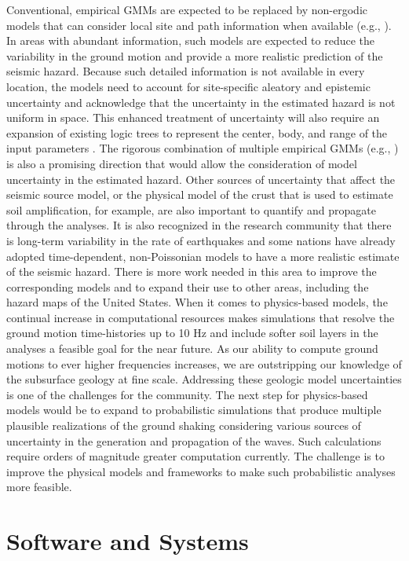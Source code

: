 Conventional, empirical GMMs are expected to be replaced by non-ergodic models that can consider local site and path information when available (e.g., \cite{abrahamson2019probabilistic}). In areas with abundant information, such models are expected to reduce the variability in the ground motion and provide a more realistic prediction of the seismic hazard. Because such detailed information is not available in every location, the models need to account for site-specific aleatory and epistemic uncertainty and acknowledge that the uncertainty in the estimated hazard is not uniform in space. This enhanced treatment of uncertainty will also require an expansion of existing logic trees to represent the center, body, and range of the input parameters \citep{gerstenberger2020seismic}.
The rigorous combination of multiple empirical GMMs (e.g., \cite{goulet2017ngaeast}) is also a promising direction that would allow the consideration of model uncertainty in the estimated hazard. Other sources of uncertainty that affect the seismic source model, or the physical model of the crust that is used to estimate soil amplification, for example, are also important to quantify and propagate through the analyses. 
It is also recognized in the research community that there is long-term variability in the rate of earthquakes and some nations have already adopted time-dependent, non-Poissonian models to have a more realistic estimate of the seismic hazard. There is more work needed in this area to improve the corresponding models and to expand their use to other areas, including the hazard maps of the United States. 
When it comes to physics-based models, the continual increase in computational resources makes simulations that resolve the ground motion time-histories up to 10 Hz and include softer soil layers in the analyses a feasible goal for the near future. As our ability to compute ground motions to ever higher frequencies increases, we are outstripping our knowledge of the subsurface geology at fine scale. Addressing these geologic model uncertainties is one of the challenges for the community.
The next step for physics-based models would be to expand to probabilistic simulations that produce multiple plausible realizations of the ground shaking considering various sources of uncertainty in the generation and propagation of the waves. Such calculations require orders of magnitude greater computation currently. The challenge is to improve the physical models and frameworks to make such probabilistic analyses more feasible.

\section{Software and Systems}
\label{sec:eq_shake_tools}

